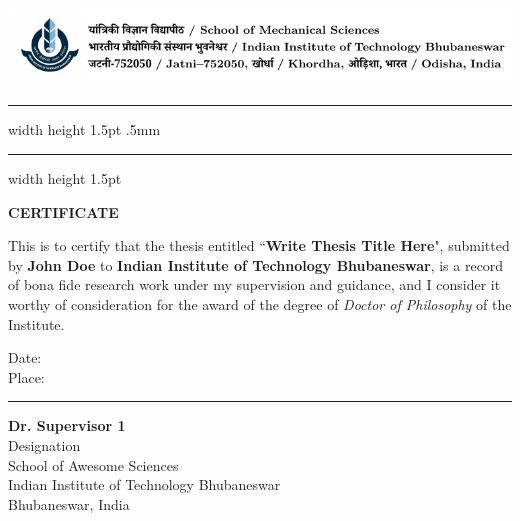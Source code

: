 
\chapter*{}
\vspace*{-5cm}


{\centering \includegraphics[width=\linewidth, scale=1]{iitbbs_letterhead}}
{\hrule width \hsize height 1.5pt \kern .5mm \hrule width \hsize height 1.5pt}

\vspace*{2ex}
\begin{center}
\textbf{\Large CERTIFICATE}
\end{center}

\par This is to certify that the thesis entitled ``\textbf{Write Thesis Title Here}", submitted by \textbf{John Doe} to \textbf{Indian Institute of Technology Bhubaneswar}, is a record of bona fide research work under my supervision and guidance, and I consider it worthy of consideration for the award of the degree of \textit{Doctor of Philosophy} of the Institute.

\vspace{4em}
\begin{minipage}[t]{0.35\textwidth}
    Date: \\
    Place:
\end{minipage}%
\hfill
\begin{minipage}[t]{0.55\textwidth}
    \raggedleft
    \hrule\vspace{2ex}
    \textbf{Dr. Supervisor 1} \\
	Designation \\
	School of Awesome Sciences \\
	Indian Institute of Technology Bhubaneswar \\
	Bhubaneswar, India \\
	
\end{minipage}


\newpage
\thispagestyle{empty}
\null\newpage
